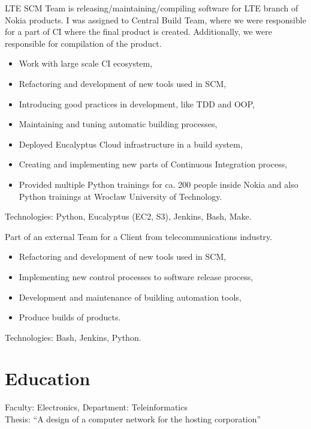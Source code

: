 \documentclass[11pt,a4paper,sans]{moderncv}
\newcommand{\newpara}{
        \vskip 0.2cm
    }
\begin{document}
%
    {}{}{
LTE SCM Team is releasing/maintaining/compiling software for LTE branch of Nokia
products. I was assigned to Central Build Team, where we were responsible for a
part of CI where the final product is created. Additionally, we were responsible for
compilation of the product.
\begin{itemize}
    \item Work with large scale CI ecosystem,
    \item Refactoring and development of new tools used in SCM,
    \item Introducing good practices in development, like TDD and OOP,
    \item Maintaining and tuning automatic building processes,
    \item Deployed Eucalyptus Cloud infrastructure in a build system,
    \item Creating and implementing new parts of Continuous Integration process,
    \item Provided multiple Python trainings for ca. 200 people inside Nokia and also Python trainings at Wrocław University of Technology.
\end{itemize}
\newpara
Technologies: Python, Eucalyptus (EC2, S3), Jenkins, Bash, Make.
}

%
    {}{}{
        Part of an external Team for a Client from telecommunications industry.
\begin{itemize}
    \item Refactoring and development of new tools used in SCM,
    \item Implementing new control processes to software release process,
    \item Development and maintenance of building automation tools,
    \item Produce builds of products.
\end{itemize}
\newpara
Technologies: Bash, Jenkins, Python.
}


\section{Education}
%
    {Faculty: Electronics, Department: Teleinformatics \\
    Thesis: “A design of a computer network for the hosting corporation”}
\end{document}
